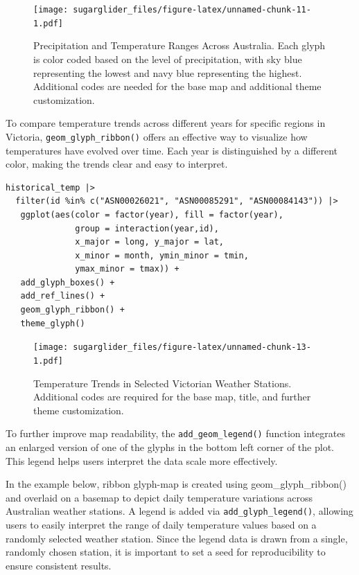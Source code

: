 \begin{figure}
\centering
\texttt{[image: sugarglider\_files/figure-latex/unnamed-chunk-11-1.pdf]}
\caption{\label{fig:unnamed-chunk-11}Precipitation and Temperature Ranges Across Australia. Each glyph is color coded based on the level of precipitation, with sky blue representing the lowest and navy blue representing the highest. Additional codes are needed for the base map and additional theme customization.}
\end{figure}

To compare temperature trends across different years for specific regions in Victoria, \texttt{geom\_glyph\_ribbon()} offers an effective way to visualize how temperatures have evolved over time. Each year is distinguished by a different color, making the trends clear and easy to interpret.

\begin{verbatim}
historical_temp |> 
  filter(id %in% c("ASN00026021", "ASN00085291", "ASN00084143")) |>
   ggplot(aes(color = factor(year), fill = factor(year),
              group = interaction(year,id),
              x_major = long, y_major = lat,
              x_minor = month, ymin_minor = tmin, 
              ymax_minor = tmax)) +
   add_glyph_boxes() +
   add_ref_lines() +
   geom_glyph_ribbon() +
   theme_glyph()
\end{verbatim}

\begin{figure}
\centering
\texttt{[image: sugarglider\_files/figure-latex/unnamed-chunk-13-1.pdf]}
\caption{\label{fig:unnamed-chunk-13}Temperature Trends in Selected Victorian Weather Stations. Additional codes are required for the base map, title, and further theme customization.}
\end{figure}

To further improve map readability, the \texttt{add\_geom\_legend()} function integrates an enlarged version of one of the glyphs in the bottom left corner of the plot. This legend helps users interpret the data scale more effectively.

In the example below, ribbon glyph-map is created using geom\_glyph\_ribbon() and overlaid on a basemap to depict daily temperature variations across Australian weather stations. A legend is added via \texttt{add\_glyph\_legend()}, allowing users to easily interpret the range of daily temperature values based on a randomly selected weather station. Since the legend data is drawn from a single, randomly chosen station, it is important to set a seed for reproducibility to ensure consistent results.


